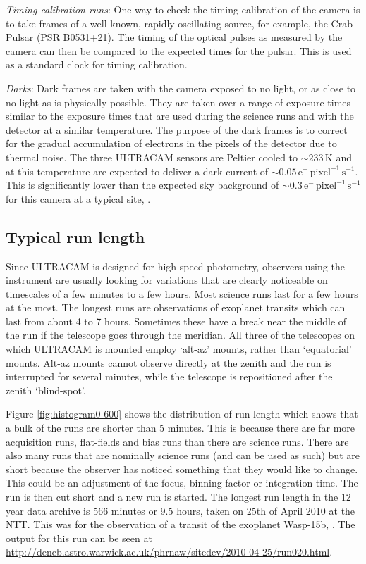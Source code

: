 \emph{Timing calibration runs}: One way to check the timing calibration of the camera is to take frames of a well-known, rapidly oscillating source, for example, the Crab Pulsar (PSR B0531+21). The timing of the optical pulses as measured by the camera can then be compared to the expected times for the pulsar. This is used as a standard clock for timing calibration.

\emph{Darks}: Dark frames are taken with the camera exposed to no light, or as close to no light as is physically possible. They are taken over a range of exposure times similar to the exposure times that are used during the science runs and with the detector at a similar temperature. The purpose of the dark frames is to correct for the gradual accumulation of electrons in the pixels of the detector due to thermal noise. The three ULTRACAM sensors are Peltier cooled to $\sim 233\,\mbox{K}$ and at this temperature are expected to deliver a dark current of $\sim0.05\,\mbox{e}^{-}\,\mbox{pixel}^{-1}\,\mbox{s}^{-1}$. This is significantly lower than the expected sky background of $\sim0.3\,\mbox{e}^{-}\,\mbox{pixel}^{-1}\,\mbox{s}^{-1}$ for this camera at a typical site, \citep{dhillon07}. 

\subsection{Typical run length}
Since ULTRACAM is designed for high-speed photometry, observers using the instrument are usually looking for variations that are clearly noticeable on timescales of a few minutes to a few hours. Most science runs last for a few hours at the most. The longest runs are observations of exoplanet transits which can last from about 4 to 7 hours. Sometimes these have a break near the middle of the run if the telescope goes through the meridian. All three of the telescopes on which ULTRACAM is mounted employ `alt-az' mounts, rather than `equatorial' mounts. Alt-az mounts cannot observe directly at the zenith and the run is interrupted for several minutes, while the telescope is repositioned after the zenith `blind-spot'.

Figure \ref{fig:histogram0-600} shows the distribution of run length which shows that a bulk of the runs are shorter than 5 minutes. This is because there are far more acquisition runs, flat-fields and bias runs than there are science runs. There are also many runs that are nominally science runs (and can be used as such) but are short because the observer has noticed something that they would like to change. This could be an adjustment of the focus, binning factor or integration time. The run is then cut short and a new run is started. The longest run length in the 12 year data archive is 566 minutes or 9.5 hours, taken on 25th of April 2010 at the NTT. This was for the observation of a transit of the exoplanet Wasp-15b, \citep{Wasp15b}. The output for this run can be seen at \url{http://deneb.astro.warwick.ac.uk/phrnaw/sitedev/2010-04-25/run020.html}. 

